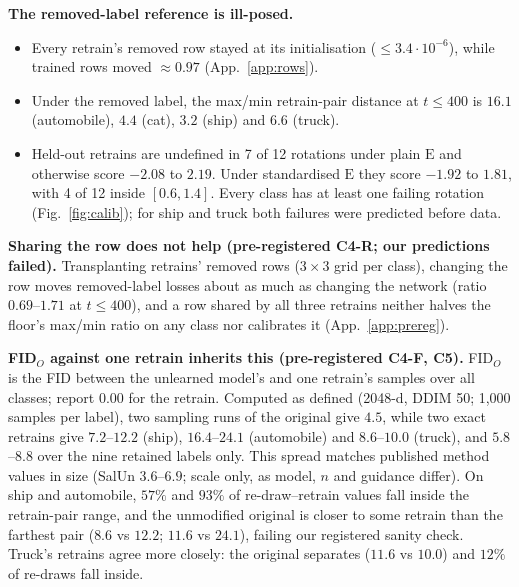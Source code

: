 \documentclass[10pt]{article}
\newcommand{\E}{\mathrm{E}}
\begin{document}
\textbf{The removed-label reference is ill-posed.}
\begin{itemize}
\item Every retrain's removed row stayed at its initialisation ($\le3.4\cdot10^{-6}$), while trained rows moved ${\approx}0.97$ (App.~\ref{app:rows}).
\item Under the removed label, the max/min retrain-pair distance at $t\le400$ is $16.1$ (automobile), $4.4$ (cat), $3.2$ (ship) and $6.6$ (truck).
\item Held-out retrains are undefined in 7 of 12 rotations under plain $\E$ and otherwise score $-2.08$ to $2.19$. Under standardised $\E$ they score $-1.92$ to $1.81$, with 4 of 12 inside $[0.6,1.4]$. Every class has at least one failing rotation (Fig.~\ref{fig:calib}); for ship and truck both failures were predicted before data.
\end{itemize}

\textbf{Sharing the row does not help (pre-registered C4-R; our predictions failed).} Transplanting retrains' removed rows ($3\times3$ grid per class), changing the row moves removed-label losses about as much as changing the network (ratio $0.69$--$1.71$ at $t\le400$), and a row shared by all three retrains neither halves the floor's max/min ratio on any class nor calibrates it (App.~\ref{app:prereg}).

\textbf{FID$_O$ against one retrain inherits this (pre-registered C4-F, C5).} FID$_O$ is the FID between the unlearned model's and one retrain's samples over all classes; \citet{zheng2026tai} report $0.00$ for the retrain. Computed as defined (2048-d, DDIM 50; 1{,}000 samples per label), two sampling runs of the original give $4.5$, while two exact retrains give $7.2$--$12.2$ (ship), $16.4$--$24.1$ (automobile) and $8.6$--$10.0$ (truck), and $5.8$--$8.8$ over the nine retained labels only. This spread matches published method values in size (SalUn $3.6$--$6.9$; scale only, as model, $n$ and guidance differ). On ship and automobile, $57\%$ and $93\%$ of re-draw--retrain values fall inside the retrain-pair range, and the unmodified original is closer to some retrain than the farthest pair ($8.6$ vs $12.2$; $11.6$ vs $24.1$), failing our registered sanity check. Truck's retrains agree more closely: the original separates ($11.6$ vs $10.0$) and $12\%$ of re-draws fall inside.
\end{document}
